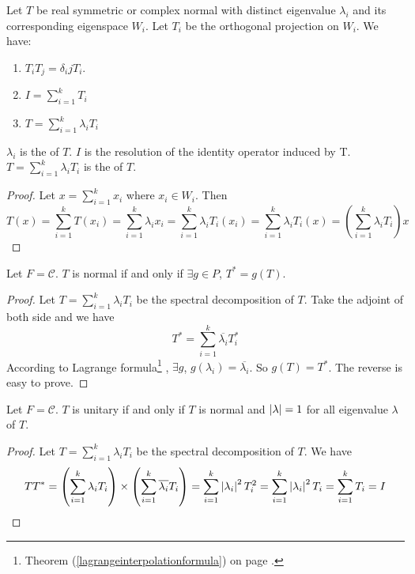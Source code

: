 \begin{theorem}
    Let $T$ be real symmetric or complex normal with distinct eigenvalue $\lambda_i$ and its corresponding eigenspace $W_i$. Let $T_i$ be the orthogonal projection on $W_i$. We have:
    \begin{enumerate}
        \item $T_i T_j = \delta_ij T_i$.
        \item $\displaystyle I = \sum_{i=1}^k T_i$
        \item $\displaystyle T = \sum_{i=1}^k \lambda_i T_i$
    \end{enumerate}
    
    $\lambda_i$ is the  of $T$. $I$ is the resolution of the identity operator induced by T. $\displaystyle T = \sum_{i=1}^k \lambda_i T_i$ is the  of $T$.
\end{theorem}
\begin{proof}
    Let $\displaystyle x= \sum_{i=1}^k x_i$ where $x_i \in W_i$. Then
    \begin{equation*}
        T(x) = \sum_{i=1}^k T(x_i) = \sum_{i=1}^k \lambda_i x_i= \sum_{i=1}^k \lambda_i T_i (x_i) = \sum_{i=1}^k \lambda_i T_i (x) = \left(\sum_{i=1}^k \lambda_i T_i \right) x
    \end{equation*}
\end{proof}

\begin{theorem}
    Let $F=\mathcal{C}$. $T$ is normal if and only if $\exists g \in P$, $T^* = g(T)$.
\end{theorem}
\begin{proof}
    Let $\displaystyle T = \sum_{i=1}^k \lambda_i T_i$ be the spectral decomposition of $T$. Take the adjoint of both side and we have
    \begin{equation}
        T^* = \sum_{i=1}^k \overline{\lambda_i} T_i^*
    \end{equation}
    According to Lagrange formula\footnote{Theorem (\ref{lagrangeinterpolationformula}) on page \pageref{lagrangeinterpolationformula}.} , $\exists g$, $g(\lambda_i) = \overline{\lambda_i}$. So $g(T) = T^*$. The reverse is easy to prove.
\end{proof}

\begin{theorem}
    Let $F=\mathcal{C}$. $T$ is unitary if and only if $T$ is normal and $\displaystyle \left\lvert \lambda \right\rvert = 1$ for all eigenvalue $\lambda$ of $T$.
\end{theorem}
\begin{proof}
    Let $\displaystyle T = \sum_{i=1}^k \lambda_i T_i$ be the spectral decomposition of $T$. We have
    \begin{equation*}
    TT^* = \left( \sum_{i=1}^k \lambda_i T_i  \right) \times \left( \sum_{i=1}^k \overline{\lambda_i} T_i \right) = \sum_{i=1}^k \displaystyle \left\lvert \lambda_i \right\rvert^2 T_i^2 = \sum_{i=1}^k \displaystyle \left\lvert \lambda_i \right\rvert^2 T_i = \sum_{i=1}^k T_i  = I    
    \end{equation*}
\end{proof}


